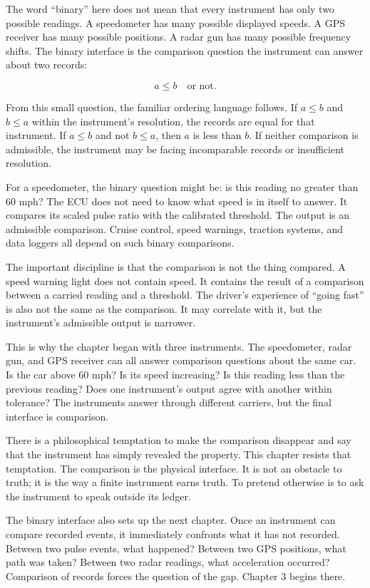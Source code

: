 The word ``binary'' here does not mean that every instrument has only two
possible readings. A speedometer has many possible displayed speeds. A GPS
receiver has many possible positions. A radar gun has many possible frequency
shifts. The binary interface is the comparison question the instrument can
answer about two records:

\[
a \leq b \quad \text{or not}.
\]

From this small question, the familiar ordering language follows. If $a \leq b$
and $b \leq a$ within the instrument's resolution, the records are equal for
that instrument. If $a \leq b$ and not $b \leq a$, then $a$ is less than $b$.
If neither comparison is admissible, the instrument may be facing incomparable
records or insufficient resolution.

For a speedometer, the binary question might be: is this reading no greater
than 60 mph? The ECU does not need to know what speed is in itself to answer.
It compares its scaled pulse ratio with the calibrated threshold. The output is
an admissible comparison. Cruise control, speed warnings, traction systems, and
data loggers all depend on such binary comparisons.

The important discipline is that the comparison is not the thing compared. A
speed warning light does not contain speed. It contains the result of a
comparison between a carried reading and a threshold. The driver's experience of
``going fast'' is also not the same as the comparison. It may correlate with
it, but the instrument's admissible output is narrower.

This is why the chapter began with three instruments. The speedometer, radar
gun, and GPS receiver can all answer comparison questions about the same car.
Is the car above 60 mph? Is its speed increasing? Is this reading less than the
previous reading? Does one instrument's output agree with another within
tolerance? The instruments answer through different carriers, but the final
interface is comparison.

There is a philosophical temptation to make the comparison disappear and say
that the instrument has simply revealed the property. This chapter resists that
temptation. The comparison is the physical interface. It is not an obstacle to
truth; it is the way a finite instrument earns truth. To pretend otherwise is to
ask the instrument to speak outside its ledger.

The binary interface also sets up the next chapter. Once an instrument can
compare recorded events, it immediately confronts what it has not recorded.
Between two pulse events, what happened? Between two GPS positions, what path
was taken? Between two radar readings, what acceleration occurred? Comparison
of records forces the question of the gap. Chapter 3 begins there.

